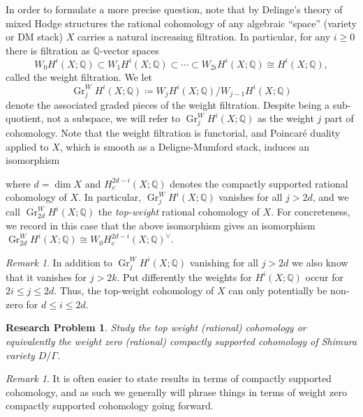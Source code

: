 \documentclass[11pt,reqno]{amsart}
\newtheorem{problem}[lemma]{Research Problem}
\theoremstyle{remark}
\newtheorem{remark}[lemma]{Remark}
\newcommand{\Gr}{\operatorname{Gr}}
\newcommand{\QQ}{\mathbb{Q}}
\begin{document}
In order to formulate a more precise question, note that by Delinge's theory of mixed Hodge structures \cite{Deligne71,Deligne74} the rational cohomology of any algebraic ``space'' (variety or DM stack)  $X$ carries a natural increasing filtration. In particular, for any $i\ge0$ there is filtration as $\QQ$-vector spaces
\[
W_{0}H^{i}(X; \QQ) \subset W_{1}H^{i}(X; \QQ) \subset \cdots \subset W_{2i}H^{i}(X; \QQ) \cong H^{i}(X; \QQ),
\]
called the weight filtration. We let 
\[
\Gr^{W}_{j}H^{i}(X; \QQ)\coloneqq W_{j}H^{i}(X; \QQ)/ W_{j-1} H^{i}(X; \QQ)
\]
denote the associated graded pieces of the weight filtration. Despite being a sub-quotient, not a subspace, we will refer to $\Gr^{W}_{j}H^{i}(X; \QQ)$ as the weight $j$ part of cohomology. Note that the weight filtration is functorial, and Poincar\'e duality applied to $X$, which is smooth as a Deligne-Mumford stack, induces an isomorphism
\begin{center}
\end{center}
where $d=\dim X$ and $H^{2d-i}_{c}\left(X; \QQ\right)$ denotes the compactly supported rational cohomology of $X$. In particular, $\Gr_{j}^{W}H^{i}\left(X; \QQ\right)$ vanishes for all $j>2d$, and we call $\Gr_{2d}^{W}H^{i}\left(X; \QQ\right)$ the \emph{top-weight} rational cohomology of $X$. For concreteness, we record in this case that the above isomorphism gives an isomorphism $\Gr_{2d}^{W}H^{i}\left(X; \QQ\right)\cong W_{0}H^{2d-i}_{c}\left(X; \QQ\right)^{\vee}$.

\begin{remark}
In addition to $\Gr_{j}^{W}H^{i}\left(X; \QQ\right)$ vanishing for all $j>2d$ we also know that it vanishes for $j>2k$. Put differently the weights for $H^{i}\left(X; \QQ\right)$ occur for $2i \leq j \leq 2d$. Thus, the top-weight cohomology of $X$ can only potentially be non-zero for $d\leq i \leq 2d$.
\end{remark}

\begin{problem}
Study the top weight (rational) cohomology or equivalently the weight zero (rational) compactly supported cohomology of Shimura variety  $D/\Gamma$. 
\end{problem}

\begin{remark}
It is often easier to state results in terms of compactly supported cohomology, and as such we generally will phrase things in terms of weight zero compactly supported cohomology going forward. 
\end{remark}
\end{document}
